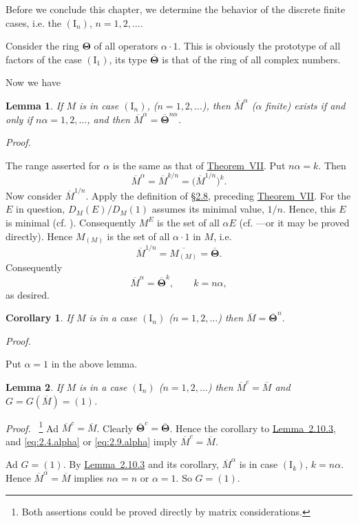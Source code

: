 \documentclass[b5paper,twoside]{article}
\newcommand{\secref}[2]{\hyperref[#1]{\mbox{\S#2}}}
\newcommand{\thmref}[2]{\hyperref[#1]{\mbox{Theorem~#2}}}
\newcommand{\lemref}[2]{\hyperref[#1]{\mbox{Lemma~#2}}}
\theoremstyle{mvnplain}
\newtheorem{lemma}{Lemma}[section]
\newtheorem*{corollary}{Corollary}
\renewenvironment{proof}[1][Proof]{%
  \par\addvspace{0.35\baselineskip}%
  \noindent\textit{#1.}\ \normalfont\ignorespaces
}{%
  \par\addvspace{0.35\baselineskip}%
}
\newcommand{\M}{\mathbf M}
\def\M{M}%
\def\mathfrak#1{#1}%
\begin{document}
Before we conclude this chapter, we determine the behavior of the discrete
finite cases, i.e. the $(\mathrm I_n)$, $n=1,2,\ldots$.

Consider the ring $\boldsymbol\Theta$ of all operators $\alpha\cdot1$.  This
is obviously the prototype of all factors of the case $(\mathrm I_1)$, its
type $\overline{\boldsymbol\Theta}$ is that of the ring of all complex
numbers.

Now we have
\begin{lemma}\label{lem:2.10.3}
If $\M$ is in case $(\mathrm I_n)$, ($n=1,2,\ldots$), then
$\overline{\M}^{\alpha}$ ($\alpha$ finite) exists if and only if
$n\alpha=1,2,\ldots$, and then
$\overline{\M}^{\alpha}=\overline{\boldsymbol\Theta}^{n\alpha}$.
\end{lemma}
\begin{proof}
The range asserted for $\alpha$ is the same as that of
\thmref{thm:VII}{VII}.  Put $n\alpha=k$.  Then
\[
  \overline{\M}^{\alpha}
  =\overline{\M}^{k/n}
  =\bigl(\overline{\M}^{1/n}\bigr)^{k}.
\]
Now consider $\overline{\M}^{1/n}$.  Apply the definition of
\secref{sec:2.8}{2.8}, preceding \thmref{thm:VII}{VII}.  For the $E$ in
question, $D_{\M}(E)/D_{\M}(1)$ assumes its minimal value, $1/n$.  Hence,
this $E$ is minimal (cf. \cite[pp.~143--144, Definition~5.1.2]{ref5}).
Consequently $\M^{E}$ is the set of all $\alpha E$ (cf.
\cite[p.~144, the last part of the proof of Lemma~5.1.3]{ref5}---or it may
be proved directly).  Hence $\M_{(\mathfrak M)}$ is the set of all
$\alpha\cdot1$ in $\mathfrak M$, i.e.
\[
  \overline{\M}^{1/n}=\overline{\M_{(\mathfrak M)}}
  =\overline{\boldsymbol\Theta}.
\]
Consequently
\[
  \overline{\M}^{\alpha}=\overline{\boldsymbol\Theta}^{k},
  \qquad k=n\alpha,
\]
as desired.
\end{proof}

\begin{corollary}\label{cor:2.10.3}
If $\M$ is in a case $(\mathrm I_n)$ ($n=1,2,\ldots$) then
$\overline{\M}=\overline{\boldsymbol\Theta}^{n}$.
\end{corollary}
\begin{proof}
Put $\alpha=1$ in the above lemma.
\end{proof}

\begin{lemma}\label{lem:2.10.4}
If $\M$ is in a case $(\mathrm I_n)$ ($n=1,2,\ldots$) then
$\overline{\M}^{c}=\overline{\M}$ and
$\mathfrak G=\mathfrak G(\overline{\M})=(1)$.
\end{lemma}
\begin{proof}\footnote{Both assertions could be proved directly by matrix
considerations.}
Ad $\overline{\M}^{c}=\overline{\M}$.  Clearly
$\overline{\boldsymbol\Theta}^{c}=\overline{\boldsymbol\Theta}$.  Hence the
corollary to \lemref{lem:2.10.3}{2.10.3}, and \eqref{eq:2.4.alpha} or
\eqref{eq:2.9.alpha} imply $\overline{\M}^{c}=\overline{\M}$.

Ad $\mathfrak G=(1)$.  By \lemref{lem:2.10.3}{2.10.3} and its corollary,
$\overline{\M}^{\alpha}$ is in case $(\mathrm I_k)$, $k=n\alpha$.  Hence
$\overline{\M}^{\alpha}=\overline{\M}$ implies $n\alpha=n$ or
$\alpha=1$.  So $\mathfrak G=(1)$.
\end{proof}
\end{document}
